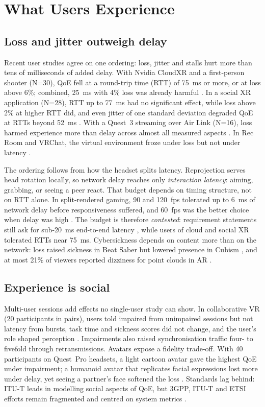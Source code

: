 \section{What Users Experience}\label{sec:qoe}

\subsection{Loss and jitter outweigh delay}
Recent user studies agree on one ordering: loss, jitter and stalls hurt more than tens of milliseconds of
added delay. With Nvidia CloudXR and a first-person shooter (N=30), QoE fell at a round-trip time (RTT) of
75~ms or more, or at loss above 6\%; combined, 25~ms with 4\% loss was already harmful \cite{W4402156718}.
In a social XR application (N=28), RTT up to 77~ms had no significant effect, while loss above 2\% at
higher RTT did, and even jitter of one standard deviation degraded QoE at RTTs beyond 52~ms
\cite{W4415822410}. With a Quest~3 streaming over Air Link (N=16), loss harmed experience more than delay
across almost all measured aspects \cite{W4404916373}. In Rec Room and VRChat, the virtual environment
froze under loss but not under latency \cite{W4404103205}.

The ordering follows from how the headset splits latency. Reprojection serves head rotation locally, so
network delay reaches only \emph{interaction latency}: aiming, grabbing, or seeing a peer react. That
budget depends on timing structure, not on RTT alone. In split-rendered gaming, 90 and 120~fps tolerated
up to 6~ms of network delay before responsiveness suffered, and 60~fps was the better choice when delay
was high \cite{W4401943426}. The budget is therefore \emph{contested}: requirement statements still ask for
sub-20~ms end-to-end latency \cite{W7126117938}, while users of cloud and social XR tolerated RTTs near
75~ms. Cybersickness depends on content more than on the network: loss raised sickness in Beat Saber but lowered presence in Cubism \cite{W4404916373}, and at most 21\% of viewers
reported dizziness for point clouds in AR \cite{W4387831705}.

\subsection{Experience is social}
Multi-user sessions add effects no single-user study can show. In collaborative VR (20 participants in
pairs), users told impaired from unimpaired sessions but not latency from bursts, task time and sickness
scores did not change, and the user's role shaped perception \cite{W4392600587}. Impairments also raised synchronisation traffic four- to fivefold through retransmissions. Avatars
expose a fidelity trade-off. With 40 participants on Quest~Pro headsets, a light cartoon avatar gave the
highest QoE under impairment; a humanoid avatar that replicates facial expressions lost more under delay,
yet seeing a partner's face softened the loss \cite{W4415821547}. Standards lag behind: ITU-T leads in
modelling social aspects of QoE, but 3GPP, ITU-T and ETSI efforts remain fragmented and centred on system
metrics \cite{W4415822422}.

